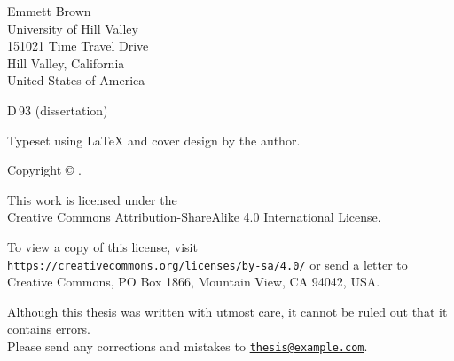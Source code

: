 {  \vfill
  
  Emmett Brown\\
  University of Hill Valley\\
  151021 Time Travel Drive\\
  Hill Valley, California\\
  United States of America
  
  \vfill
  
  D\,93 (dissertation)
  
  \vspace{1em}
  
  
  \vspace{1em}
  
  Typeset using \LaTeX{} and cover design by the author.
  
  Copyright \copyright{} \theyear{} \theauthor{}.
  
  \vspace{1em}
  
  \hangindent=29mm%
  This work is licensed under the\\
  Creative Commons Attribution-ShareAlike 4.0 International License.
  
  To view a copy of this license, visit
  \href{%
    https://creativecommons.org/licenses/by-sa/4.0/%
  }{
    \texttt{https://creativecommons.org/licenses/by-sa/4.0/}%
  }
  or send a letter to
  Creative Commons, PO Box 1866, Mountain View, CA 94042, USA.
  
  \vspace{1em}
  
  Although this thesis was written with utmost care,
  it cannot be ruled out that it contains errors.\\
  Please send any corrections and mistakes to
  \href{mailto:thesis@example.com}{\texttt{thesis@example.com}}.
}
\fi

\cleardoublepage
